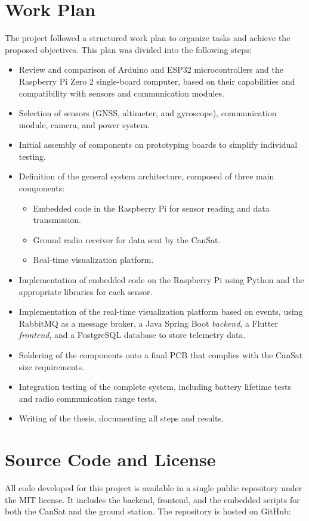 \section{Work Plan}
The project followed a structured work plan to organize tasks and achieve the proposed objectives.  
This plan was divided into the following steps:

\begin{itemize}
    \item Review and comparison of Arduino and ESP32 microcontrollers and the Raspberry Pi Zero 2 single-board computer, based on their capabilities and compatibility with sensors and communication modules.
    \item Selection of sensors (GNSS, altimeter, and gyroscope), communication module, camera, and power system.
    \item Initial assembly of components on prototyping boards to simplify individual testing.
    \item Definition of the general system architecture, composed of three main components:
    \begin{itemize}
        \item Embedded code in the Raspberry Pi for sensor reading and data transmission.
        \item Ground radio receiver for data sent by the CanSat.
        \item Real-time visualization platform.
    \end{itemize}
    \item Implementation of embedded code on the Raspberry Pi using Python and the appropriate libraries for each sensor.
    \item Implementation of the real-time visualization platform based on events, using RabbitMQ as a message broker, a Java Spring Boot \emph{backend}, a Flutter \emph{frontend}, and a PostgreSQL database to store telemetry data.
    \item Soldering of the components onto a final PCB that complies with the CanSat size requirements.
    \item Integration testing of the complete system, including battery lifetime tests and radio communication range tests.
    \item Writing of the thesis, documenting all steps and results.
\end{itemize}

\section{Source Code and License}
All code developed for this project is available in a single public repository under the MIT license.  
It includes the backend, frontend, and the embedded scripts for both the CanSat and the ground station.  
The repository is hosted on GitHub:

